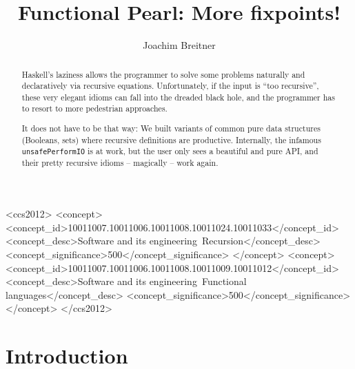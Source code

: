 \documentclass[manuscript,anonymous,screen,acmsmall]{acmart}
\begin{document}
\title{Functional Pearl: More fixpoints!}

\author{Joachim Breitner}


\begin{abstract}
Haskell’s laziness allows the programmer to solve some problems naturally and declaratively via recursive equations. Unfortunately, if the input is “too recursive”, these very elegant idioms can fall into the dreaded black hole, and the programmer has to resort to more pedestrian approaches.

It does not have to be that way: We built variants of common pure data structures (Booleans, sets) where recursive definitions are productive. Internally, the infamous \texttt{unsafePerformIO} is at work, but the user only sees a beautiful and pure API, and their pretty recursive idioms -- magically -- work again.

\end{abstract}

\begin{CCSXML}
<ccs2012>
   <concept>
       <concept_id>10011007.10011006.10011008.10011024.10011033</concept_id>
       <concept_desc>Software and its engineering~Recursion</concept_desc>
       <concept_significance>500</concept_significance>
       </concept>
   <concept>
       <concept_id>10011007.10011006.10011008.10011009.10011012</concept_id>
       <concept_desc>Software and its engineering~Functional languages</concept_desc>
       <concept_significance>500</concept_significance>
       </concept>
 </ccs2012>
\end{CCSXML}



\maketitle

\section{Introduction}
\end{document}
